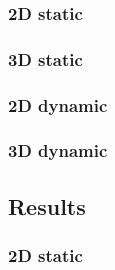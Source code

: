 \documentclass[12pt, a4paper]{article}
\begin{document}
\subsubsection{2D static}

\begin{scriptsize}
\begin{ttfamily}

\end{ttfamily}
\end{scriptsize}

\subsubsection{3D static}

\begin{scriptsize}
\begin{ttfamily}

\end{ttfamily}
\end{scriptsize}

\subsubsection{2D dynamic}

\begin{scriptsize}
\begin{ttfamily}

\end{ttfamily}
\end{scriptsize}

\subsubsection{3D dynamic}

\begin{scriptsize}
\begin{ttfamily}

\end{ttfamily}
\end{scriptsize}

\subsection{Results}

\subsubsection{2D static}
\end{document}
